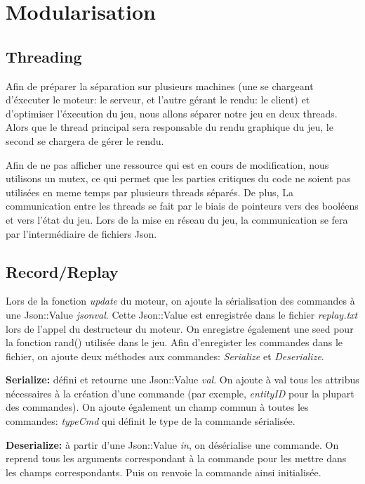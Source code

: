 \section{Modularisation}
\label{sec:module}

\subsection{Threading}
Afin de préparer la séparation sur plusieurs machines (une se chargeant d'éxecuter le moteur: le serveur, et l'autre gérant le rendu: le client) et d'optimiser l'éxecution du jeu, nous allons séparer notre jeu en deux threads. Alors que le thread principal sera responsable du rendu graphique du jeu, le second se chargera de gérer le rendu.

Afin de ne pas afficher une ressource qui est en cours de modification, nous utilisons un mutex, ce qui permet que les parties critiques du code ne soient pas utilisées en meme temps par plusieurs threads séparés. De plus, La communication entre les threads se fait par le biais de pointeurs vers des booléens et vers l'état du jeu. Lors de la mise en réseau du jeu, la communication se fera par l'intermédiaire de fichiers Json.

\subsection{Record/Replay}
Lors de la fonction \textit{update} du moteur, on ajoute la sérialisation des commandes à une Json::Value \textit{jsonval}. Cette Json::Value est enregistrée dans le fichier \textit{replay.txt} lors de l'appel du destructeur du moteur. On enregistre également une seed pour la fonction rand() utilisée dans le jeu.
Afin d'enregister les commandes dans le fichier, on ajoute deux méthodes aux commandes: \textit{Serialize} et \textit{Deserialize}.
\par \textbf{Serialize:} défini et retourne une Json::Value \textit{val}. On ajoute à val tous les attribus nécessaires à la création d'une commande (par exemple, \textit{entityID} pour la plupart des commandes). On ajoute également un champ commun à toutes les commandes: \textit{typeCmd} qui définit le type de la commande sérialisée.
\par \textbf{Deserialize:} à partir d'une Json::Value \textit{in}, on désérialise une commande. On reprend tous les arguments correspondant à la commande pour les mettre dans les champs correspondants. Puis on renvoie la commande ainsi initialisée.

